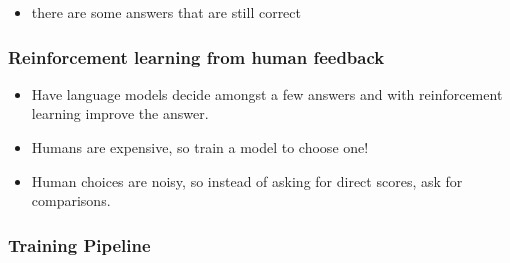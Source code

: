 \documentclass[11pt]{article}
\begin{document}
\begin{minipage}[l]{.5\linewidth}
    \begin{figure}[H]
        \centering
    \end{figure}    
\end{minipage}\hfill
\begin{minipage}[r]{.48\linewidth}
    \begin{itemize}
        \item there are some answers that are still correct
    \end{itemize}
\end{minipage}

\subsubsection{Reinforcement learning from human feedback}

\begin{minipage}[l]{.5\linewidth}
    \begin{figure}[H]
        \centering
    \end{figure}    
\end{minipage}\hfill
\begin{minipage}[r]{.48\linewidth}
    \begin{itemize}
        \item Have language models decide amongst a few answers and with reinforcement learning improve the answer.
    \end{itemize}
\end{minipage}

\begin{minipage}[l]{.5\linewidth}
    \begin{figure}[H]
        \centering
    \end{figure}    
\end{minipage}\hfill
\begin{minipage}[r]{.48\linewidth}
    \begin{itemize}
        \item Humans are expensive, so train a model to choose one! 
        \item Human choices are noisy, so instead of asking for direct scores, ask for comparisons.
    \end{itemize}
\end{minipage}

\subsubsection{Training Pipeline}

\begin{figure}[H]
    \centering
\end{figure}    
\end{document}
